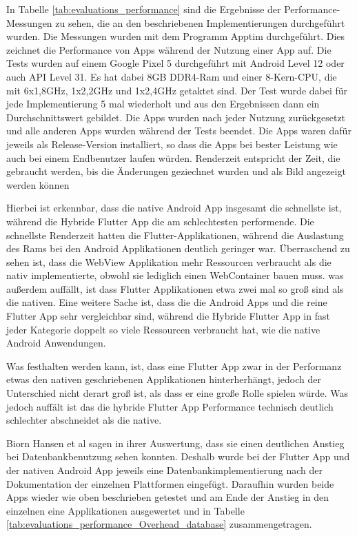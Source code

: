In Tabelle \ref{tab:evaluations_performance} sind die Ergebnisse der Performance-Messungen zu sehen, die an den beschriebenen Implementierungen durchgeführt wurden.
Die Messungen wurden mit dem Programm Apptim durchgeführt. Dies zeichnet die Performance von Apps während der Nutzung einer App auf. Die Tests wurden auf einem Google Pixel 5 durchgeführt mit Android Level 12 oder auch API Level 31. Es hat dabei 8GB DDR4-Ram und einer 8-Kern-CPU, die mit 6x1,8GHz, 1x2,2GHz und 1x2,4GHz getaktet sind.
Der Test wurde dabei für jede Implementierung 5 mal wiederholt und aus den Ergebnissen dann ein Durchschnittswert gebildet. Die Apps wurden nach jeder Nutzung zurückgesetzt und alle anderen Apps wurden während der Tests beendet. Die Apps waren dafür jeweils als Release-Version installiert, so dass die Apps bei bester Leistung wie auch bei einem Endbenutzer laufen würden.
Renderzeit entspricht der Zeit, die gebraucht werden, bis die Änderungen geziechnet wurden und als Bild angezeigt werden können

Hierbei ist erkennbar, dass die native Android App insgesamt die schnellste ist, während die Hybride Flutter App die am schlechtesten performende. Die schnellste Renderzeit hatten die Flutter-Applikationen, während die Auslastung des Rams bei den Android Applikationen deutlich geringer war. Überraschend zu sehen ist, dass die WebView Applikation mehr Ressourcen verbraucht als die nativ implementierte, obwohl sie lediglich einen WebContainer bauen muss. was außerdem auffällt, ist dass Flutter Applikationen etwa zwei mal so groß sind als die nativen. Eine weitere Sache ist, dass die die Android Apps und die reine Flutter App sehr vergleichbar sind, während die Hybride Flutter App in fast jeder Kategorie doppelt so viele Ressourcen verbraucht hat, wie die native Android Anwendungen.

Was festhalten werden kann, ist, dass eine Flutter App zwar in der Performanz etwas den nativen geschriebenen Applikationen hinterherhängt, jedoch der Unterschied nicht derart groß ist, als dass er eine große Rolle spielen würde. Was jedoch auffält ist das die hybride Flutter App Performance technisch deutlich schlechter abschneidet als die native.  

Biorn Hansen et al\cite{BirnHansen.2020} sagen in ihrer Auswertung, dass sie einen deutlichen Anstieg bei Datenbankbenutzung sehen konnten. Deshalb wurde bei der Flutter App und der nativen Android App  jeweils eine Datenbankimplementierung nach der Dokumentation der einzelnen Plattformen eingefügt. Daraufhin wurden beide Apps wieder wie oben beschrieben getestet und am Ende der Anstieg in den einzelnen eine Applikationen ausgewertet und in Tabelle \ref{tab:evaluations_performance_Overhead_database} zusammengetragen.

